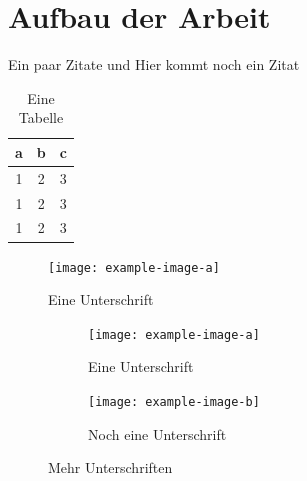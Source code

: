 \section{Aufbau der Arbeit}
{}

Ein paar Zitate \cite{Hartley2004} und \cite{Bishop2006} Hier kommt noch ein Zitat 
\cite{DorrChristopherH.2015SSBo}


\begin{table}[ht]
	\centering
	\begin{tabular}{c|c|c}
		a & b & c \\ \hline
		1 & 2 & 3 \\
		1 & 2 & 3 \\
		1 & 2 & 3
	\end{tabular}
	\caption{Eine Tabelle}
\end{table}

\begin{figure}[ht]
	\centering
	\texttt{[image: example-image-a]}
	\caption{Eine Unterschrift}
\end{figure}

\begin{figure}[ht]
	\centering
	\begin{subfigure}[b]{0.45\textwidth}
		\texttt{[image: example-image-a]}
		\caption{Eine Unterschrift}
	\end{subfigure} \hfill
	\begin{subfigure}[b]{0.45\textwidth}
		\texttt{[image: example-image-b]}
		\caption{Noch eine Unterschrift}
	\end{subfigure}
	\caption{Mehr Unterschriften}
\end{figure}



